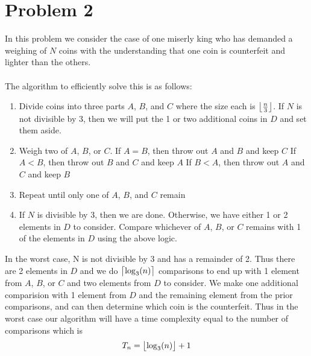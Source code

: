 \section*{Problem 2}

In this problem we consider the case of one miserly king who has 
demanded a weighing of $N$ coins with the understanding that one coin
is counterfeit and lighter than the others. 
\\
\\
The algorithm to efficiently solve this is as follows:
\begin{enumerate}[itemsep=0.25em]
    \item Divide coins into three parts $A$, $B$, and $C$ where the size
          each is $\floor[\big]{\frac{n}{3}}$. If $N$ is not divisible
          by 3, then we will put the 1 or two additional coins in $D$
          and set them aside.
    \item Weigh two of $A$, $B$, or $C$.
    \subitem If $A = B$,  then throw out $A$ and $B$ and keep $C$
    \subitem If $A < B$, then throw out $B$ and $C$ and keep $A$
    \subitem If $B < A$, then throw out $A$ and $C$ and keep $B$
    \item Repeat until only one of $A$, $B$, and $C$ remain
    \item If $N$ is divisible by 3, then we are done. Otherwise, we
          have either 1 or 2 elements in $D$ to consider. Compare 
          whichever of $A$, $B$, or $C$ remains with 1 of the elements
          in $D$ using the above logic.
\end{enumerate} 
%
In the worst case, N is not divisible by 3 and has a remainder of 2. 
Thus there are 2 elements in $D$ and we do $\ceil[\big]{\log_3(n)}$ 
comparisons to end up with 1 element from $A$, $B$, or $C$ and two 
elements from $D$ to consider. We make one additional comparision with 
1 element from $D$ and the remaining element from the prior comparisons,
and can then determine which coin is the counterfeit. Thus in the worst
case our algorithm will have a time complexity equal to the number of
comparisons which is
$$
    T_n = \floor[\big]{\log_3(n)} + 1
$$
